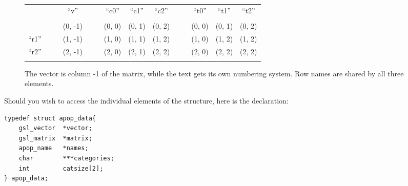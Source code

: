 \def\atouch{\phantom {.}}
\renewcommand\arraystretch{1.1}
\begin{figure}
\hspace {-0.5cm}
\begin{tabular}{lc|ccc|ccccc|cccc}
\hhline{~~~-~~---~~---}
        &&& \multicolumn{1}{|c|}{``v''}   &&& \multicolumn{1}{|c}{``c0''} & ``c1'' & \multicolumn{1}{c|}{``c2''}  &&& \multicolumn{1}{|c}{``t0''} & ``t1'' & \multicolumn{1}{c|}{``t2''}    \\\hhline{~~~-~~---~~---}
\atouch&\atouch&\atouch&\atouch&\atouch&\atouch&\atouch&\atouch&\atouch&\atouch&\atouch&\atouch&\atouch\\\hhline{-}
\multicolumn{1}{|c|}{``r0''}&&&(0, -1)   &&& (0, 0) & (0, 1) & (0, 2) &&& (0, 0) & (0, 1) & (0, 2)\\ 
\multicolumn{1}{|c|}{``r1''}&&&(1, -1)   &&& (1, 0) & (1, 1) & (1, 2) &&& (1, 0) & (1, 2) & (1, 2)\\
\multicolumn{1}{|c|}{``r2''}&\atouch&\atouch&(2, -1)   &\atouch&& (2, 0) & (2, 1) & (2, 2) &\atouch&\atouch& (2, 0) & (2, 2) & (2, 2)\\\hhline{-}
\end{tabular}
\caption{The vector is column -1 of the matrix, while the text gets its
own numbering system. Row names are shared by all three
elements.}
\label{datalayout}
\end{figure}

Should you wish to access the individual elements of the  structure, here is the declaration:

\begin{lstlisting}
typedef struct apop_data{
    gsl_vector  *vector;
    gsl_matrix  *matrix;
    apop_name   *names;
    char        ***categories;
    int         catsize[2];
} apop_data;
\end{lstlisting}

